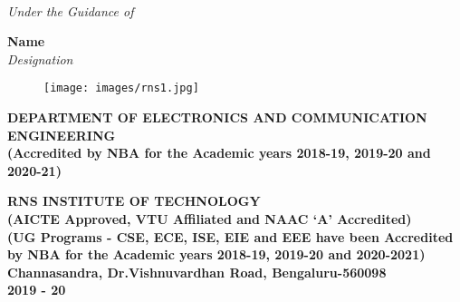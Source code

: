 \begin{titlingpage}
\begin{tabular}{lll}
\end{tabular}
\vspace{0.5cm}\\
\textit{\color{white}Under the Guidance of}


\Large{\textbf{\color{white}Name}}\\
\textit{\color{white}Designation}\\

\begin{figure}[h]
	\centering
	\texttt{[image: images/rns1.jpg]}
\end{figure}


\begin{center}
	\scriptsize\textbf{\color{white}DEPARTMENT OF ELECTRONICS AND COMMUNICATION ENGINEERING}\\
	\small\textbf{\color{white}(Accredited by NBA for the Academic years 2018-19, 2019-20 and 2020-21)}	
\end{center}
\begin{center}
	\vspace{0.1cm}
	\large\textbf{\color{white}RNS INSTITUTE OF TECHNOLOGY}\\
	\small\textbf{\color{white}(AICTE Approved, VTU Affiliated and NAAC `A' Accredited)\\
		(UG Programs - CSE, ECE, ISE, EIE and EEE have been Accredited by NBA for the Academic years 2018-19, 2019-20 and 2020-2021)\\
		Channasandra, Dr.Vishnuvardhan Road, Bengaluru-560098\\
		2019 - 20}
\end{center}
\end{titlingpage}
